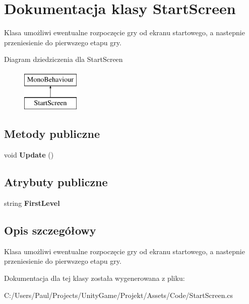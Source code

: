 \section{Dokumentacja klasy Start\+Screen}
\label{class_start_screen}


Klasa umożliwi ewentualne rozpoczęcie gry od ekranu startowego, a nastepnie przeniesienie do pierwszego etapu gry.  


Diagram dziedziczenia dla Start\+Screen\begin{figure}[H]
\begin{center}
\leavevmode
\includegraphics[height=2.000000cm]{class_start_screen}
\end{center}
\end{figure}
\subsection*{Metody publiczne}
\begin{DoxyCompactItemize}
\item 
void {\bfseries Update} ()\label{class_start_screen_ab77f1e4efe3c8c259e8957dccc8ef8ae}

\end{DoxyCompactItemize}
\subsection*{Atrybuty publiczne}
\begin{DoxyCompactItemize}
\item 
string {\bfseries First\+Level}\label{class_start_screen_a0dc7263b0b6fa4ccab70f1ebab366ade}

\end{DoxyCompactItemize}


\subsection{Opis szczegółowy}
Klasa umożliwi ewentualne rozpoczęcie gry od ekranu startowego, a nastepnie przeniesienie do pierwszego etapu gry. 



Dokumentacja dla tej klasy została wygenerowana z pliku\+:\begin{DoxyCompactItemize}
\item 
C\+:/\+Users/\+Paul/\+Projects/\+Unity\+Game/\+Projekt/\+Assets/\+Code/Start\+Screen.\+cs\end{DoxyCompactItemize}
